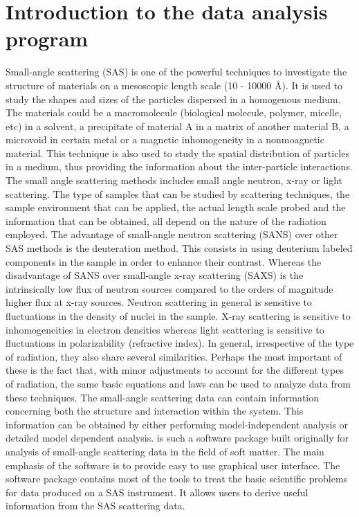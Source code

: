 \chapter{Introduction to the data analysis program \SASfit}

Small-angle scattering (SAS) is one of the powerful techniques to
investigate the structure of materials on a mesoscopic length scale
(10 - 10000 {\AA}). It is used to study the shapes and sizes of the
particles dispersed in a homogenous medium. The materials could be a
macromolecule (biological molecule, polymer, micelle, etc) in a
solvent, a precipitate of material A in a matrix of another material
B, a microvoid in certain metal or a magnetic inhomogeneity in a
nonmoagnetic material. This technique is also used to study the
spatial distribution of particles in a medium, thus providing the
information about the inter-particle interactions. The small angle
scattering methods includes small angle neutron, x-ray or light
scattering. The type of samples that can be studied by scattering
techniques, the sample environment that can be applied, the actual
length scale probed and the information that can be obtained, all
depend on the nature of the radiation employed. The advantage of
small-angle neutron scattering (SANS) over other SAS methods is the
deuteration method. This consists in using deuterium labeled
components in the sample in order to enhance their contrast. Whereas
the disadvantage of SANS over small-angle x-ray scattering (SAXS) is
the intrinsically low flux of neutron sources compared to the orders
of magnitude higher flux at x-ray sources. Neutron scattering in
general is sensitive to fluctuations in the density of nuclei in the
sample. X-ray scattering is sensitive to inhomogeneities in electron
densities whereas light scattering is sensitive to fluctuations in
polarizability (refractive index). In general, irrespective of the
type of radiation, they also share several similarities. Perhaps the
most important of these is the fact that, with minor adjustments to
account for the different types of radiation, the same basic
equations and laws can be used to analyze data from these
techniques. The small-angle scattering data can contain information
concerning both the structure and interaction within the system. This
information can be obtained by either performing model-independent
analysis or detailed model dependent analysis. \SASfit is such a
software package built originally for analysis of small-angle scattering data
in the field of soft matter. The main emphasis of the
software is to provide easy to use graphical user interface.
The software package contains most of
the tools to treat the basic scientific problems for
data produced on a SAS instrument. It allows users to
derive useful information from the SAS scattering data.

